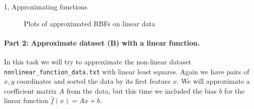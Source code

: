\begin{task}{1, Approximating functions}
\begin{figure}[H]
\centering
{}
\caption{Plots of approximated RBFs on linear data}
\label{fig:t1_1-rbf}
\end{figure}

\paragraph{Part 2: Approximate dataset (B) with a linear function.}
In this task we will try to approximate the non-linear dataset \verb|nonlinear_function_data.txt| with linear least squares. Again we have pairs of $x,y$ coordinates and sorted the data by its first feature $x$. We will approximate a coefficient matrix $A$ from the data, but this time we included the bias $b$ for the linear function $\hat{f}(x)=Ax+b$.


\end{task}
